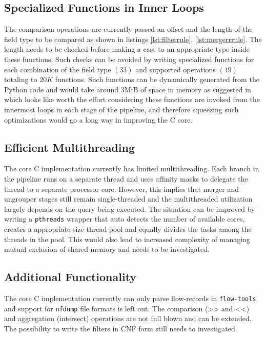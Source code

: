 \subsection{Specialized Functions in Inner Loops}\label{subsec:special-fns}
The comparison operations are currently passed an offset and the length of the field type to be compared as shown in listings \ref{lst:filterrule},  \ref{lst:mergerrrule}. The length needs to be checked before making a cast to an appropriate type inside these functions. Such checks can be avoided by writing specialized functions for each combination of the field type $(33)$ and supported operations $(19)$ totaling to $20K$ functions. Such functions can be dynamically generated from the Python code and would take around $3$MiB of space in memory as suggested in \cite{jschauer:thesis:2011} which looks like worth the effort considering these functions are invoked from the innermost loops in each stage of the pipeline, and therefore squeezing such optimizations would go a long way in improving the C core.

\subsection{Efficient Multithreading}\label{subsec:multithreading}
The core C implementation currently has limited multithreading. Each branch in the pipeline runs on a separate thread and uses affinity masks to delegate the thread to a separate processor core. However, this implies that merger and ungrouper stages still remain single-threaded and the multithreaded utilization largely depends on the query being executed. The situation can be improved by writing a \texttt{pthreads} wrapper that auto detects the number of available cores, creates a appropriate size thread pool and equally divides the tasks among the threads in the pool. This would also lead to increased complexity of managing mutual exclusion of shared memory and needs to be investigated.

\subsection{Additional Functionality}\label{subsec:additional-functionality}
The core C implementation currently can only parse flow-records in \texttt{flow-tools} and support for \texttt{nfdump} file formats is left out. The comparison (>> and <<) and aggregation (intersect) operations are not full blown and can be extended. The possibility to write the filters in \ac{CNF} form still needs to investigated. 